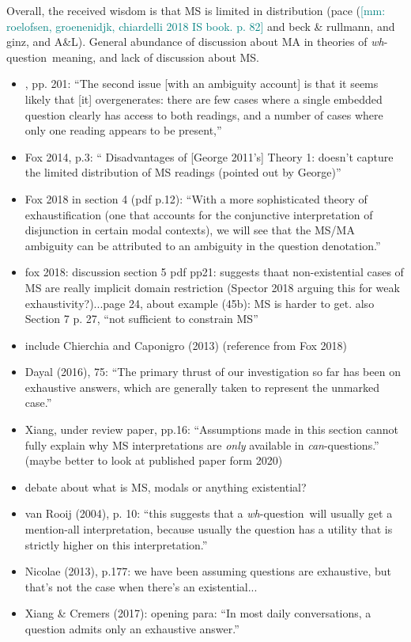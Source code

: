 \documentclass[12pt,letterpaper,table,svgnames,dvipsnames]{article}
\newcommand{\mm}[1]{\textcolor{teal}{[mm: #1]}}
\newcommand{\whq}{\emph{wh}-question~}
\begin{document}
Overall, the received wisdom is that MS is limited in distribution (pace (\mm{roelofsen, groenenidjk, chiardelli 2018 IS book. p. 82} and beck \& rullmann, and ginz, and A\&L). General abundance of discussion about MA in theories of \whq meaning, and lack of discussion about MS. 
\begin{itemize}
    \item {}, pp. 201: ``The second issue [with an ambiguity account] is that it seems likely that [it] overgenerates: there are few cases where a single embedded question clearly has access to both readings, and a number of cases where only one reading appears to be present,'' 
    \item Fox 2014, p.3: `` Disadvantages of [George 2011's] Theory 1: doesn't capture the limited distribution of MS readings (pointed out by George)'' 
    \item Fox 2018 in section 4 (pdf p.12): ``With a more sophisticated theory of exhaustification (one that accounts for the conjunctive interpretation of disjunction in certain modal contexts), we will see that the MS/MA ambiguity can be attributed to an ambiguity in the question denotation.''
    \item fox 2018: discussion section 5 pdf pp21: suggests thaat non-existential cases of MS are really implicit domain restriction (Spector 2018 arguing this for weak exhaustivity?)...page 24, about example (45b): MS is harder to get. also Section 7 p. 27, ``not sufficient to constrain MS''
    \item include Chierchia and Caponigro (2013) (reference from Fox 2018)
    \item Dayal (2016), 75: ``The primary thrust of our investigation so far has been on exhaustive answers, which are generally taken to represent the unmarked case.''
    \item Xiang, under review paper, pp.16: ``Assumptions made in this section cannot fully explain why MS interpretations are \emph{only} available in \emph{can}-questions.'' (maybe better to look at published paper form 2020)
    \item debate about what is MS, modals or anything existential?
    \item van Rooij (2004), p. 10: ``this suggests that a \whq will usually get a mention-all interpretation, because usually the question has a utility that is strictly higher on this interpretation.''
    \item Nicolae (2013), p.177: we have been assuming questions are exhaustive, but that's not the case when there's an existential...
    \item Xiang \& Cremers (2017): opening para: ``In most daily conversations, a question admits only an exhaustive answer.''
\end{itemize}
\end{document}
